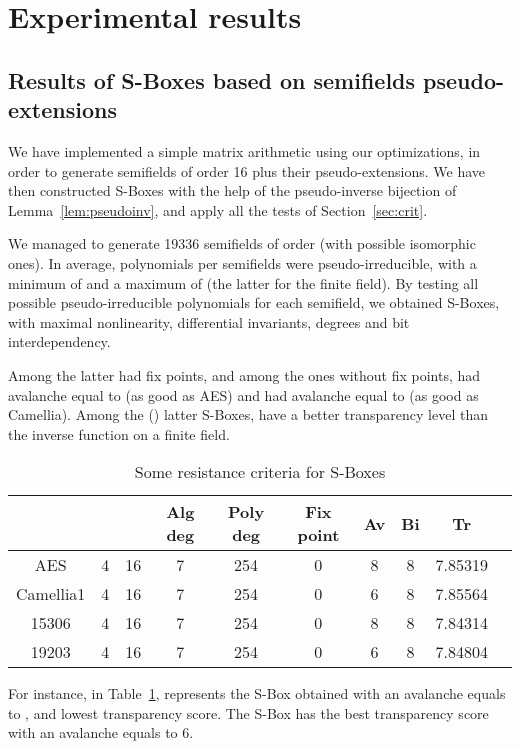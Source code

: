 \documentclass{article}\usepackage{amsthm}
\newcommand{\SBox}{S-Box\xspace}
\newcommand{\SBoxes}{S-Boxes\xspace}
\begin{document}
\section{Experimental results}\label{sec:expe}
\subsection{Results of \SBoxes based on semifields
  pseudo-extensions}

We have implemented a simple matrix arithmetic using our optimizations, in order
to generate semifields of order 16 plus their pseudo-extensions. We have then
constructed \SBoxes with the help of the pseudo-inverse bijection of
Lemma~\ref{lem:pseudoinv}, and apply all the tests of Section~\ref{sec:crit}. 

We managed to generate 19336 semifields of order  (with possible isomorphic ones). 
In average,  polynomials per semifields
were pseudo-irreducible, with a minimum of  and a maximum of  (the
latter for the finite field).
By testing all possible pseudo-irreducible polynomials for each semifield, we
obtained  \SBoxes, with maximal nonlinearity, differential invariants,
degrees and bit interdependency. 



Among the latter  had fix points, and among the ones without fix points,
 had avalanche equal to  (as good as AES) and  had avalanche
equal to  (as good as Camellia).
Among the () latter \SBoxes,  have a better transparency level than the inverse function on
a finite field. \\




\begin{table}[htb]\center
\begin{tabular}{|c|c|c|c|c|c|c|c|c|c|}
  \hline 
  &  &   & Alg deg & Poly deg & 
  Fix point & Av & Bi &  Tr \\
  \hline
  AES & 4 & 16 & 7 & 254 & 0 & 8 & 8  & 7.85319 \\
  Camellia1 & 4 & 16 & 7 & 254 & 0 & 6 & 8 & 7.85564 \\
  15306 & 4 & 16 & 7 & 254 & 0 & 8 & 8 & 7.84314 \\
  19203 & 4 & 16 & 7 & 254 & 0 & 6 & 8 & 7.84804 \\
  \hline
\end{tabular}
\caption{Some resistance criteria for \SBoxes}\label{tab:critbox}
\end{table}

For instance, in Table~\ref{tab:critbox},  represents the \SBox obtained with an avalanche equals to , and
lowest transparency score. The \SBox  has the best transparency score
with an avalanche equals to 6. \\
\end{document}
